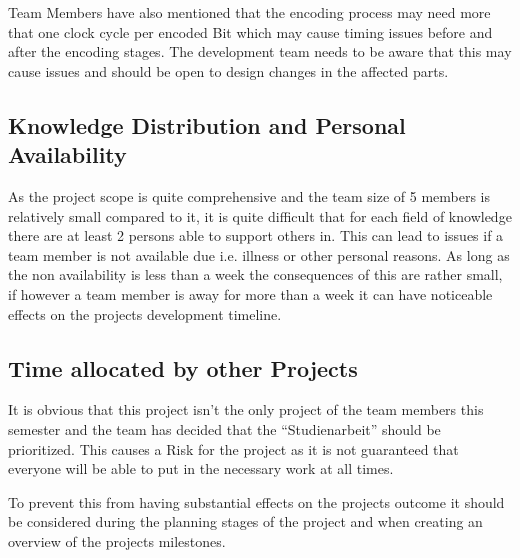 Team Members have also mentioned that the encoding process may need more that one clock cycle per encoded Bit which may cause timing issues before and after the encoding stages. The development team needs to be aware that this may cause issues and should be open to design changes in the affected parts.

\subsection{Knowledge Distribution and Personal Availability}
As the project scope is quite comprehensive and the team size of 5 members is relatively small compared to it, it is quite difficult that for each field of knowledge there are at least 2 persons able to support others in. This can lead to issues if a team member is not available due i.e. illness or other personal reasons. As long as the non availability is less than a week the consequences of this are rather small, if however a team member is away for more than a week it can have noticeable effects on the projects development timeline.

\subsection{Time allocated by other Projects}
It is obvious that this project isn't the only project of the team members this semester and the team has decided that the “Studienarbeit” should be prioritized. This causes a Risk for the project as it is not guaranteed that everyone will be able to put in the necessary work at all times.

To prevent this from having substantial effects on the projects outcome it should be considered during the planning stages of the project and when creating an overview of the projects milestones.